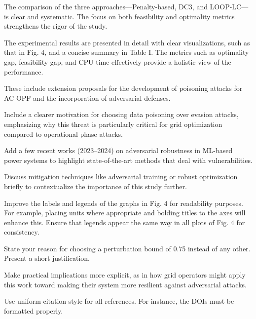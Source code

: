 The comparison of the three approaches—Penalty-based, DC3, and LOOP-LC—is clear and systematic. The focus on both feasibility and optimality metrics strengthens the rigor of the study.

The experimental results are presented in detail with clear visualizations, such as that in Fig. 4, and a concise summary in Table I. The metrics such as optimality gap, feasibility gap, and CPU time effectively provide a holistic view of the performance.

These include extension proposals for the development of poisoning attacks for AC-OPF and the incorporation of adversarial defenses.

Include a clearer motivation for choosing data poisoning over evasion attacks, emphasizing why this threat is particularly critical for grid optimization compared to operational phase attacks.

Add a few recent works (2023–2024) on adversarial robustness in ML-based power systems to highlight state-of-the-art methods that deal with vulnerabilities.

Discuss mitigation techniques like adversarial training or robust optimization briefly to contextualize the importance of this study further.

Improve the labels and legends of the graphs in Fig. 4 for readability purposes. For example, placing units where appropriate and bolding titles to the axes will enhance this. Ensure that legends appear the same way in all plots of Fig. 4 for consistency.

State your reason for choosing a perturbation bound of 0.75 instead of any other. Present a short justification.

Make practical implications more explicit, as in how grid operators might apply this work toward making their system more resilient against adversarial attacks.

Use uniform citation style for all references. For instance, the DOIs must be formatted properly.


